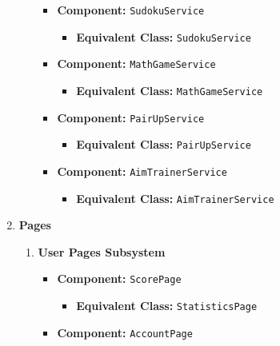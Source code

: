 \documentclass[11pt,a4paper]{article}
\begin{document}
\begin{enumerate}[label=\textbf{\arabic*.}, ref=\arabic*]
\begin{enumerate}[label=\textbf{\alph*.}, ref=\theenumi.\alph*]
\begin{itemize}
                    \item \textbf{Component:} \texttt{SudokuService}
                        \begin{itemize}
                            \item \textbf{Equivalent Class:} \texttt{SudokuService}
                        \end{itemize}
                    \item \textbf{Component:} \texttt{MathGameService}
                        \begin{itemize}
                            \item \textbf{Equivalent Class:} \texttt{MathGameService}
                        \end{itemize}
                    \item \textbf{Component:} \texttt{PairUpService}
                        \begin{itemize}
                            \item \textbf{Equivalent Class:} \texttt{PairUpService}
                        \end{itemize}
                    \item \textbf{Component:} \texttt{AimTrainerService}
                        \begin{itemize}
                            \item \textbf{Equivalent Class:} \texttt{AimTrainerService}
                        \end{itemize}
                \end{itemize}
        \end{enumerate}
    \item \textbf{Pages}
        \begin{enumerate}[label=\textbf{\alph*.}, ref=\theenumi.\alph*]
            \item \textbf{User Pages Subsystem}
                \begin{itemize}
                    \item \textbf{Component:} \texttt{ScorePage}
                        \begin{itemize}
                            \item \textbf{Equivalent Class:} \texttt{StatisticsPage}
                        \end{itemize}
                    \item \textbf{Component:} \texttt{AccountPage}
                        \begin{itemize}

\end{itemize}
\end{itemize}
\end{enumerate}
\end{enumerate}
\end{document}
